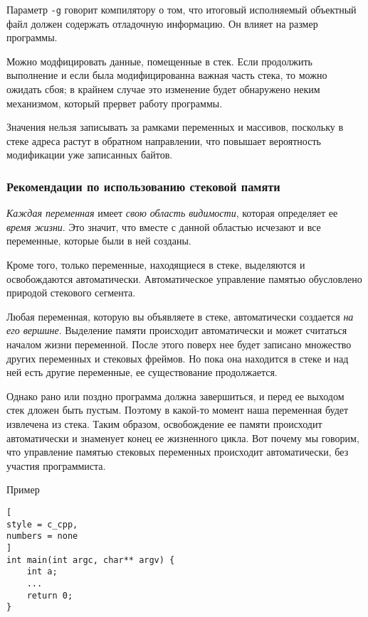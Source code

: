 \documentclass[%
	11pt,
	a4paper,
	utf8,
		]{article}
\begin{document}
Параметр \verb|-g| говорит компилятору о том, что итоговый исполняемый объектный файл должен содержать отладочную информацию. Он влияет на размер программы.


Можно модфицировать данные, помещенные в стек. Если продолжить выполнение и если была модифицированна важная часть стека, то можно ожидать сбоя; в крайнем случае это изменение будет обнаружено неким механизмом, который прервет  работу программы.

Значения нельзя записывать за рамками переменных и массивов, поскольку в стеке адреса растут в обратном направлении, что повышает вероятность модификации уже записанных байтов.

\subsubsection{Рекомендации по использованию стековой памяти}

\emph{Каждая переменная} имеет \emph{свою область видимости}, которая определяет ее \emph{время жизни}. Это значит, что вместе с данной областью исчезают и все переменные, которые были в ней созданы.

Кроме того, только переменные, находящиеся в стеке, выделяются и освобождаются автоматически. Автоматическое управление памятью обусловлено природой стекового сегмента.

Любая переменная, которую вы объявляете в стеке, автоматически создается \emph{на его вершине}. Выделение памяти происходит автоматически и может считаться началом жизни переменной. После этого поверх нее будет записано множество других переменных и стековых фреймов. Но пока она находится в стеке и над ней есть другие переменные, ее существование продолжается.

Однако рано или поздно программа должна завершиться, и перед ее выходом стек дложен быть пустым. Поэтому в какой-то момент наша переменная будет извлечена из стека. Таким образом, освобождение ее памяти происходит автоматически и знаменует конец ее жизненного цикла. Вот почему мы говорим, что управление памятью стековых переменных происходит автоматически, без участия программиста.

Пример
\begin{lstlisting}[
style = c_cpp,
numbers = none
]
int main(int argc, char** argv) {
    int a;
    ...
    return 0;
}
\end{lstlisting}
\end{document}
